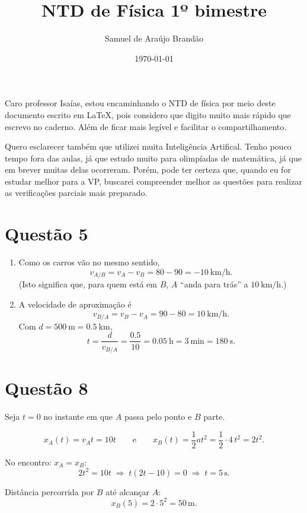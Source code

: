 \documentclass[12pt]{article}
\title{\sffamily\bfseries{NTD de Física 1º bimestre}}
\author{Samuel de Araújo Brandão}
\date{\today}
\begin{document}
\maketitle
Caro professor Isaías, estou encaminhando o NTD de física por meio deste documento escrito em \LaTeX,
pois considero que digito muito mais rápido que escrevo no caderno. Além de ficar mais legível e
facilitar o compartilhamento.

Quero esclarecer também que utilizei muita Inteligência Artifical. Tenho pouco tempo fora das aulas,
já que estudo muito para olimpíadas de matemática, já que em brever muitas delas ocorreram. Porém, pode
ter certeza que, quando eu for estudar melhor para a VP, buscarei compreender melhor as questões para
realizar as verificações parciais mais preparado.

\tableofcontents

\clearpage

\section{Questão 5}
\begin{enumerate}
	\item[(a)] Como os carros vão no mesmo sentido,
	      \[
		      v_{A/B}=v_A-v_B=80-90=\boxed{-10\ \text{km/h}}.
	      \]
	      (Isto significa que, para quem está em \(B\), \(A\) “anda para trás” a \(10\ \text{km/h}\).)

	\item[(b)] A velocidade de aproximação é
	      \[
		      v_{B/A}=v_B-v_A=90-80=10\ \text{km/h}.
	      \]
	      Com \(d=500\ \text{m}=0.5\ \text{km}\),
	      \[
		      t=\frac{d}{v_{B/A}}=\frac{0.5}{10}=0.05\ \text{h}=3\ \text{min}=\boxed{180\ \text{s}}.
	      \]
\end{enumerate}

\clearpage

\section{Questão 8}
Seja \(t=0\) no instante em que \(A\) passa pelo ponto e \(B\) parte.

\[
	x_A(t)=v_A t=10t
	\qquad\text{e}\qquad
	x_B(t)=\frac12 at^2=\frac12\cdot 4\,t^2=2t^2.
\]

No encontro: \(x_A=x_B\):
\[
	2t^2=10t \;\Rightarrow\; t(2t-10)=0 \;\Rightarrow\; t=5\,\text{s}.
\]

Distância percorrida por \(B\) até alcançar \(A\):
\[
	x_B(5)=2\cdot 5^2= \boxed{50\,\text{m}}.
\]
\end{document}
